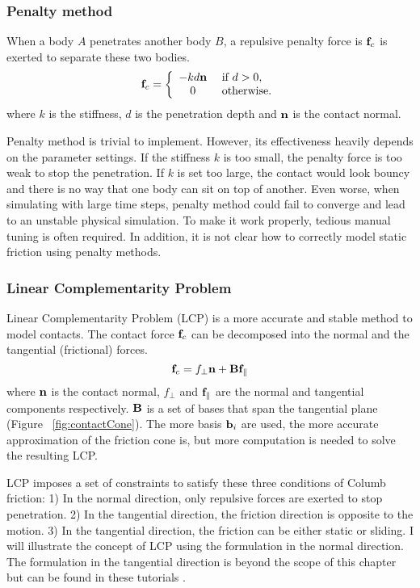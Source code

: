 \subsubsection{Penalty method}
When a body $A$ penetrates another body $B$, a repulsive penalty force is $\mathbf{f}_c$ is exerted to separate these two bodies.
\begin{equation}
\mathbf{f}_c=
\left\{
\begin{array}{cl}
-kd\mathbf{n} & \textrm{        if } d > 0,\\
0 & \textrm{        otherwise.}
\end{array}
\right.
\end{equation}
where $k$ is the stiffness, $d$ is the penetration depth and $\mathbf{n}$ is the contact normal. 

Penalty method is trivial to implement. However, its effectiveness heavily depends on the parameter settings. If the stiffness $k$ is too small, the penalty force is too weak to stop the penetration. If $k$ is set too large, the contact would look bouncy and there is no way that one body can sit on top of another. Even worse, when simulating with large time steps, penalty method could fail to converge and lead to an unstable physical simulation. To make it work properly, tedious manual tuning is often required. In addition, it is not clear how to correctly model static friction using penalty methods.

\subsubsection{Linear Complementarity Problem}

Linear Complementarity Problem (LCP) is a more accurate and stable method to model contacts. The contact force $\mathbf{f}_c$ can be decomposed into the normal and the tangential (frictional) forces.
\begin{displaymath}
\mathbf{f}_c = f_\perp\mathbf{n}+\mathbf{B}\mathbf{f}_{\parallel}
\end{displaymath}
where $\mathbf{n}$ is the contact normal, $f_\perp$ and $\mathbf{f}_{\parallel}$ are the normal and tangential components respectively. $\mathbf{B}$ is a set of bases that span the tangential plane (Figure ~\ref{fig:contactCone}). The more basis $\mathbf{b}_i$ are used, the more accurate approximation of the friction cone is, but more computation is needed to solve the resulting LCP. 

LCP imposes a set of constraints to satisfy these three conditions of Columb friction: 1) In the normal direction, only repulsive forces are exerted to stop penetration. 2) In the tangential direction, the friction direction is opposite to the motion. 3) In the tangential direction, the friction can be either static or sliding. I will illustrate the concept of LCP using the formulation in the normal direction. The formulation in the tangential direction is beyond the scope of this chapter but can be found in these tutorials \cite{}. 


